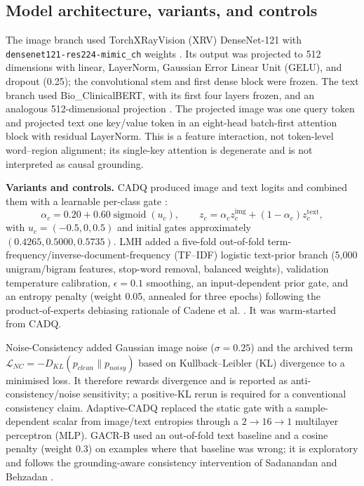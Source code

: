 \subsection{Model architecture, variants, and controls}\label{sec:architecture}
The image branch used TorchXRayVision (XRV) DenseNet-121 with
\texttt{densenet121-res224-mimic\_ch} weights \citep{huang2017densenet,cohen2022torchxrayvision}.
Its output was projected to 512 dimensions with linear, LayerNorm, Gaussian
Error Linear Unit (GELU), and
dropout (0.25); the convolutional stem and first dense block were frozen. The
text branch used Bio\_ClinicalBERT, with its first four layers frozen, and an
analogous 512-dimensional projection \citep{devlin2019bert,alsentzer2019clinicalbert}.
The projected image was one query token and projected text one key/value token
in an eight-head batch-first attention block with residual LayerNorm. This is a
feature interaction, not token-level word--region alignment; its single-key
attention is degenerate and is not interpreted as causal grounding.

\textbf{Variants and controls.}
CADQ produced image and text logits and combined them with a learnable
per-class gate \citep{arevalo2017gmu}:
\begin{equation}
\alpha_c=0.20+0.60\operatorname{sigmoid}(u_c),\qquad
z_c=\alpha_cz^{\mathrm{img}}_c+(1-\alpha_c)z^{\mathrm{text}}_c,
\end{equation}
with $u_c=(-0.5,0,0.5)$ and initial gates approximately
$(0.4265,0.5000,0.5735)$. LMH added a five-fold out-of-fold
term-frequency/inverse-document-frequency (TF--IDF)
logistic text-prior branch (5,000 unigram/bigram features, stop-word removal,
balanced weights), validation temperature calibration, $\epsilon=0.1$
smoothing, an input-dependent prior gate, and an entropy penalty (weight 0.05,
annealed for three epochs) following the product-of-experts debiasing rationale
of Cadene et al. \citep{cadene2019rubi}. It was warm-started from CADQ.

Noise-Consistency added Gaussian image noise ($\sigma=0.25$) and the archived
term $\mathcal{L}_{NC}=-D_{KL}(p_{clean}\|p_{noisy})$ based on
Kullback--Leibler (KL) divergence to a minimised loss. It
therefore rewards divergence and is reported as anti-consistency/noise
sensitivity; a positive-KL rerun is required for a conventional consistency
claim. Adaptive-CADQ replaced the static gate with a sample-dependent scalar
from image/text entropies through a $2\rightarrow16\rightarrow1$ multilayer
perceptron (MLP). GACR-B
used an out-of-fold text baseline and a cosine penalty (weight 0.3) on examples
where that baseline was wrong; it is exploratory and follows the grounding-aware
consistency intervention of Sadanandan and Behzadan
\citep{sadanandan2026consistentdangerous}.


